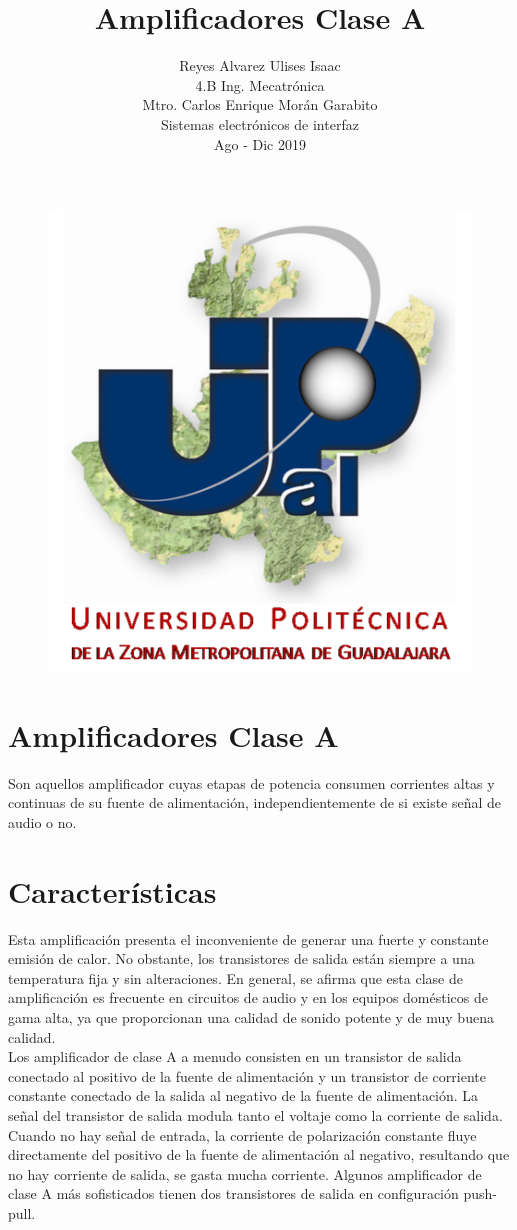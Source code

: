 \documentclass[12pt,a4paper]{article}
\author{Reyes Alvarez Ulises Isaac\\4.B    Ing. Mecatrónica\\Mtro. Carlos Enrique Morán Garabito\\Sistemas electrónicos de interfaz\\Ago - Dic 2019}
\title{Amplificadores Clase A}
\begin{document}
\maketitle
\begin{figure}[hbtp]
\centering
\includegraphics[scale=1.7]{Circuitos/Universidad.png}
\end{figure}

\newpage
\section*{Amplificadores Clase A}
Son aquellos amplificador cuyas etapas de potencia consumen corrientes altas y continuas de su fuente de alimentación, independientemente de si existe señal de audio o no.

\section{Características}
Esta amplificación presenta el inconveniente de generar una fuerte y constante emisión de calor. No obstante, los transistores de salida están siempre a una temperatura fija y sin alteraciones. En general, se afirma que esta clase de amplificación es frecuente en circuitos de audio y en los equipos domésticos de gama alta, ya que proporcionan una calidad de sonido potente y de muy buena calidad.\\
Los amplificador de clase A a menudo consisten en un transistor de salida conectado al positivo de la fuente de alimentación y un transistor de corriente constante conectado de la salida al negativo de la fuente de alimentación. La señal del transistor de salida modula tanto el voltaje como la corriente de salida. Cuando no hay señal de entrada, la corriente de polarización constante fluye directamente del positivo de la fuente de alimentación al negativo, resultando que no hay corriente de salida, se gasta mucha corriente. Algunos amplificador de clase A más sofisticados tienen dos transistores de salida en configuración push-pull.
\end{document}
